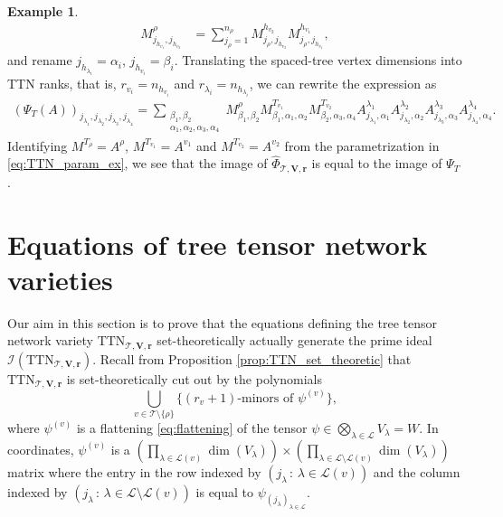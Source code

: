 \documentclass[12pt]{article}
\theoremstyle{definition}
\newtheorem{example}[theorem]{Example}
\numberwithin{theorem}{section}
\begin{document}
\begin{example}
\begin{align*}
    M^\rho_{j_{h_{v_1}}, j_{h_{v_2}}} &= \sum_{j_\rho=1}^{n_\rho}M^{h_{v_2}}_{j_\rho, j_{h_{v_2}}}M^{h_{v_1}}_{j_\rho, j_{h_{v_1}}},
\end{align*}
and rename $j_{h_{\lambda_i}} = \alpha_i$, $j_{h_{v_i}} = \beta_i$. Translating the spaced-tree vertex dimensions into TTN ranks, that is, $r_{v_i} = n_{h_{v_i}}$ and $r_{\lambda_i} = n_{h_{\lambda_i}}$, we can rewrite the expression as
\begin{align*}
    (\Psi_T(A))_{j_{\lambda_1},j_{\lambda_2},j_{\lambda_3},j_{\lambda_4}} = \sum_{\substack{\beta_1, \beta_2 \\ \alpha_1, \alpha_2, \alpha_3, \alpha_4}} M^\rho_{\beta_1, \beta_2}M^{T_{v_1}}_{\beta_1, \alpha_1, \alpha_2}M^{T_{v_2}}_{\beta_2, \alpha_3, \alpha_4}A^{\lambda_1}_{j_{\lambda_1},\alpha_1} A^{\lambda_2}_{j_{\lambda_2},\alpha_2}A^{\lambda_3}_{j_{\lambda_3},\alpha_3} A^{\lambda_4}_{j_{\lambda_4},\alpha_4}.
\end{align*}
Identifying $M^{T_{\rho}} = A^\rho$, $M^{T_{v_1}} = A^{v_1}$ and $M^{T_{v_2}} = A^{v_2}$ from the parametrization in \eqref{eq:TTN_param_ex}, we see that the image of $\widehat{\Phi}_{\mathscr T,\mathbf V,\mathbf r}$ is equal to the image of $\Psi_T$. 
\end{example}



\section{Equations of tree tensor network varieties}  \label{sec:equations}
Our aim in this section is to prove that 
the equations defining the tree tensor network variety $\mathrm{TTN}_{\mathscr{T}, \mathbf{V}, \mathbf{r}}$ set-theoretically actually generate the prime ideal $\mathcal{I}(\mathrm{TTN}_{\mathscr{T}, \mathbf{V}, \mathbf{r}})$.  Recall from Proposition \ref{prop:TTN_set_theoretic} that $\mathrm{TTN}_{\mathscr{T}, \mathbf{V}, \mathbf{r}}$ is set-theoretically cut out by the polynomials
\begin{equation} \label{eq:ideal-generators}
     \bigcup_{v \in \mathscr{T}\setminus \{\rho\}} \{(r_v+1)\textrm{-minors of  } \psi^{(v)}\},
\end{equation}
where $\psi^{(v)}$ is a flattening \eqref{eq:flattening} of the 
tensor $\psi \in \bigotimes_{\lambda \in \mathscr{L}} V_\lambda = W$.
In coordinates, 
$\psi^{(v)}$ is a 
$(\prod_{\lambda \in \mathscr{L}(v)} \dim(V_\lambda)) \times 
(\prod_{\lambda \in\mathscr{L}\setminus \mathscr{L}(v)}\dim(V_\lambda))$ matrix where the 
entry in the row indexed by $(j_\lambda \, : \, \lambda \in \mathscr{L}(v))$ and the column indexed
by $(j_\lambda \, : \, \lambda \in \mathscr{L} \setminus \mathscr{L}(v))$ is 
equal to $\psi_{(j_\lambda)_{\lambda \in \mathscr{L}}}$. 
\end{document}
